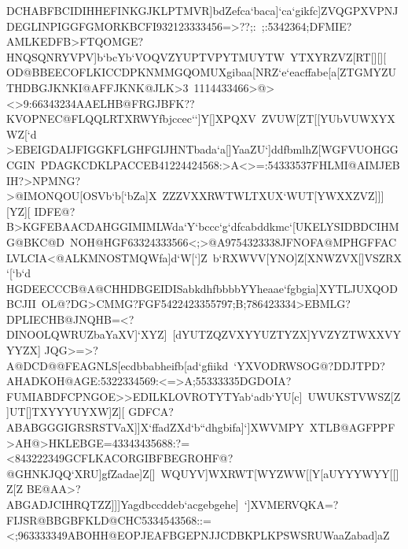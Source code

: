{{ \hbox{DCHABFBCIDIHHEFINKGJKLPTMVR]bdZefca`baca]`ca`gikfc]ZVQGPXVPNJDEGLINPIGGFGMORKBCFI932123333456=>??;:%
 ;:5342364;DFMIE?AMLKEDFB>FTQOMGE?HNQSQNRYVPV]b`bcYb`VOQVZYUPTVPYTMUYTW%
 YTXYRZVZ[RT[][][}
 \hbox{OD@BBEECOFLKICCDPKNMMGQOMUXgibaa[NRZ`e`eacffabe[a[ZTGMYZUTHDBGJKNKI@AFFJKNK@JLK>3%
 1114433466>@><>9:66343234AAELHB@FRGJBFK??KVOPNEC@FLQQLRTXRWYfbjccec``]Y[]XPQXV%
 ZVUW[ZT[[YUbVUWXYXWZ[`d}
 \hbox{>EBEIGDAIJFIGGKFLGHFGIJHNTbada`a[]YaaZU`]ddfbmlhZ[WGFVUOHGGCGIN%
 PDAGKCDKLPACCEB41224424568:>A<>=:54333537FHLMI@AIMJEBIH?>NPMNG?>@IMONQOU[OSVb`b[`bZa]X%
 ZZZVXXRWTWLTXUX`WUT[YWXXZVZ]]][YZ][}
 \hbox{IDFE@?B>KGFEBAACDAHGGIMIMLWda`Y`bccc`g`dfcabddkmc`[UKELYSIDBDCIHMG@BKC@D%
 NOH@HGF63324333566<;>@A9754323338JFNOFA@MPHGFFACLVLCIA<@ALKMNOSTMQWfa]d`W[`]Z%
 b`RXWVV[YNO]Z[XNWZVX[]VSZRX`[`b`d}
 \hbox{HGDEECCCB@A@CHHDBGEIDISabkdhfbbbbYYheaae`fgbgia]XYTLJUXQODBCJII%
 OL@?DG>CMMG?FGF5422423355797;B;786423334>EBMLG?DPLIECHB@JNQHB=<?DINOOLQWRUZbaYaXV]`XYZ]%
 [dYUTZQZVXYYUZTYZX]YVZYZTWXXVYYYZX]}
 \hbox{JQG>=>?A@DCD@@FEAGNLS[ecdbbabheifb[ad`gfiikd%
 `YXVODRWSOG@?DDJTPD?AHADKOH@AGE:5322334569:<=>A;55333335DGDOIA?FUMIABDFCPNGOE>>EDILKLOVROTYTYab`adb`YU[c]%
 UWUKSTVWSZ[Z]UT[]TXYYYUYXW]Z][}
 \hbox{GDFCA?ABABGGGIGRSRSTVaX]]X`ffadZXd`b``dhgbifa]`]XWVMPY%
 XTLB@AGFPPF>AH@>HKLEBGE=43343435688:?=<843222349GCFLKACORGIBFBEGROHF@?@GHNKJQQ`XRU]gfZadae]Z[]%
 WQUYV]WXRWT[WYZWW[[Y[aUYYYWYY[[]Z[Z}
 \hbox{BE@AA>?ABGADJCIHRQTZZ]]]Yagdbccddeb`acgebgehe]%
 `]XVMERVQKA=?FIJSR@BBGBFKLD@CHC5334543568::=<;963333349ABOHH@EOPJEAFBGEPNJJCDBKPLKPSWSRUWaaZabad]aZ%
}}}
